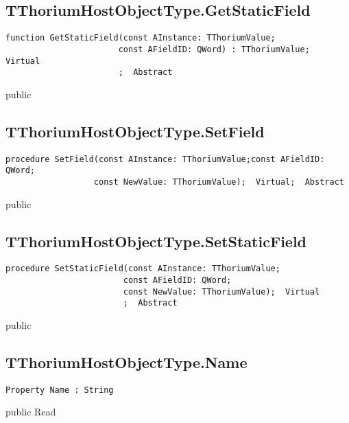 \subsection{TThoriumHostObjectType.GetStaticField}
\label{thoriumcore:thorium:tthoriumhostobjecttype:getstaticfield}
\begin{FPCList}
\Synopsis
\Declaration 

\begin{verbatim}
function GetStaticField(const AInstance: TThoriumValue;
                       const AFieldID: QWord) : TThoriumValue;  Virtual
                       ;  Abstract
\end{verbatim}
\Visibility
public
\Description
\Errors
\end{FPCList}
\subsection{TThoriumHostObjectType.SetField}
\label{thoriumcore:thorium:tthoriumhostobjecttype:setfield}
\begin{FPCList}
\Synopsis
\Declaration 

\begin{verbatim}
procedure SetField(const AInstance: TThoriumValue;const AFieldID: QWord;
                  const NewValue: TThoriumValue);  Virtual;  Abstract
\end{verbatim}
\Visibility
public
\Description
\Errors
\end{FPCList}
\subsection{TThoriumHostObjectType.SetStaticField}
\label{thoriumcore:thorium:tthoriumhostobjecttype:setstaticfield}
\begin{FPCList}
\Synopsis
\Declaration 

\begin{verbatim}
procedure SetStaticField(const AInstance: TThoriumValue;
                        const AFieldID: QWord;
                        const NewValue: TThoriumValue);  Virtual
                        ;  Abstract
\end{verbatim}
\Visibility
public
\Description
\Errors
\end{FPCList}
\subsection{TThoriumHostObjectType.Name}
\label{thoriumcore:thorium:tthoriumhostobjecttype:name}
\begin{FPCList}
\Synopsis
\Declaration 

\begin{verbatim}
Property Name : String
\end{verbatim}
\Visibility
public
\Access
Read
\Description
\end{FPCList}

